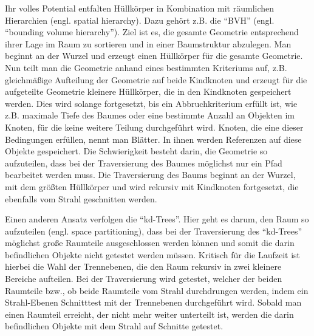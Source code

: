 Ihr volles Potential entfalten Hüllkörper in Kombination mit räumlichen Hierarchien (engl. spatial hierarchy). Dazu gehört z.B. die "`BVH"' (engl. "`bounding volume hierarchy"'). Ziel ist es, die gesamte Geometrie entsprechend ihrer Lage im Raum zu sortieren und in einer Baumstruktur abzulegen. Man beginnt an der Wurzel und erzeugt einen Hüllkörper für die gesamte Geometrie. Nun teilt man die Geometrie anhand eines bestimmten Kriteriums auf, z.B. gleichmäßige Aufteilung der Geometrie auf beide Kindknoten und erzeugt für die aufgeteilte Geometrie kleinere Hüllkörper, die in den Kindknoten gespeichert werden. Dies wird solange fortgesetzt, bis ein Abbruchkriterium erfüllt ist, wie z.B. maximale Tiefe des Baumes oder eine bestimmte Anzahl an Objekten im Knoten, für die keine weitere Teilung durchgeführt wird. Knoten, die eine dieser Bedingungen erfüllen, nennt man Blätter. In ihnen werden Referenzen auf diese Objekte gespeichert. Die Schwierigkeit besteht darin, die Geometrie so aufzuteilen, dass bei der Traversierung des Baumes möglichst nur ein Pfad bearbeitet werden muss. Die Traversierung des Baums beginnt an der Wurzel,
mit dem größten Hüllkörper und wird rekursiv mit Kindknoten fortgesetzt, die ebenfalls vom Strahl geschnitten werden.
 

%

Einen anderen Ansatz verfolgen die "`kd-Trees"'. Hier geht es darum, den Raum so aufzuteilen (engl. space partitioning), dass bei der Traversierung des "`kd-Trees"' möglichst große Raumteile ausgeschlossen werden können und somit die darin befindlichen Objekte nicht getestet werden müssen. Kritisch für die Laufzeit ist hierbei die Wahl der Trennebenen, die den Raum rekursiv in zwei kleinere Bereiche aufteilen. Bei der Traversierung wird getestet, welcher der beiden Raumteile bzw., ob beide Raumteile vom Strahl durchdrungen werden, indem ein Strahl-Ebenen Schnitttest mit der Trennebenen durchgeführt wird. Sobald man einen Raumteil erreicht, der nicht mehr weiter unterteilt ist, werden die darin befindlichen Objekte mit dem Strahl auf Schnitte getestet.


